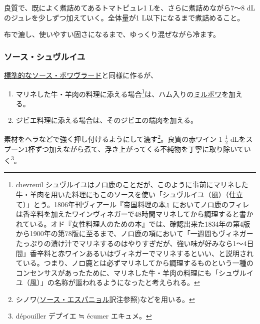 \begin{recette}
良質で、既によく煮詰めてあるトマトピュレ1 Lを、さらに煮詰めながら7〜8
dLのジュレを少しずつ加えていく。全体量が1 L以下になるまで煮詰めること。

布で漉し、使いやすい固さになるまで、ゆっくり混ぜながら冷ます。

\hypertarget{sauce-chevreuil}{%
\subsubsection{ソース・シュヴルイユ}\label{sauce-chevreuil}}



\protect\hyperlink{sauce-poivrade}{標準的なソース・ポワヴラード}と同様に作るが、

\begin{enumerate}
\def\labelenumi{\arabic{enumi}.}
\item
  マリネした牛・羊肉の料理に添える場合\footnote{chevreuil
    シュヴルイユはノロ鹿のことだが、このように事前にマリネした牛・羊肉を用いた料理にもこのソースを使い「シュヴルイユ（風）（仕立て）」とう。1806年刊ヴィアール『帝国料理の本』においてノロ鹿のフィレは香辛料を加えたワインヴィネガーで48時間マリネしてから調理すると書かれている。オド『女性料理人のための本』では、確認出来た1834年の第4版から1900年の第78版に至るまで、ノロ鹿の項において「一週間もヴィネガーたっぷりの漬け汁でマリネするのはやりすぎだが、強い味が好みなら1〜4日間」香辛料と赤ワインあるいはヴィネガーでマリネするといい、と説明されている。つまり、ノロ鹿とは必ずマリネしてから調理するものという一種のコンセンサスがあったために、マリネした牛・羊肉の料理にも「シュヴルイユ（風）」の名称が謳われるようになったと考えられる。}は、ハム入りの\protect\hyperlink{mirepoix}{ミルポワ}を加える。
\item
  ジビエ料理に添える場合は、そのジビエの端肉を加える。
\end{enumerate}

素材をヘラなどで強く押し付けるようにして漉す\footnote{シノワ(\protect\hyperlink{sauce-espagnole}{ソース・エスパニョル}訳注参照)などを用いる。}。良質の赤ワイン
1 \(\frac{1}{2}\)
dLをスプーン1杯ずつ加えながら煮て、浮き上がってくる不純物を丁寧に取り除いていく\footnote{dépouiller
  デプイエ ≒ écumer エキュメ。}。


\end{recette}
